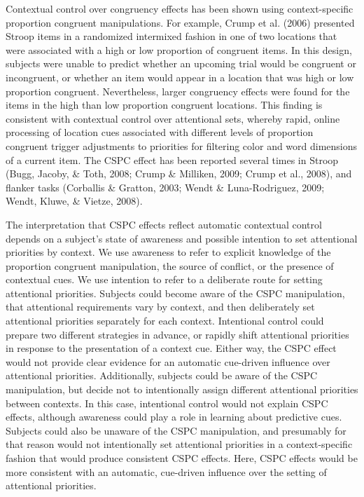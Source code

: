 \documentclass[english,,man,floatsintext]{apa6}
\begin{document}
Contextual control over congruency effects has been shown using
context-specific proportion congruent manipulations. For example, Crump
et al. (2006) presented Stroop items in a randomized intermixed fashion
in one of two locations that were associated with a high or low
proportion of congruent items. In this design, subjects were unable to
predict whether an upcoming trial would be congruent or incongruent, or
whether an item would appear in a location that was high or low
proportion congruent. Nevertheless, larger congruency effects were found
for the items in the high than low proportion congruent locations. This
finding is consistent with contextual control over attentional sets,
whereby rapid, online processing of location cues associated with
different levels of proportion congruent trigger adjustments to
priorities for filtering color and word dimensions of a current item.
The CSPC effect has been reported several times in Stroop (Bugg, Jacoby,
\& Toth, 2008; Crump \& Milliken, 2009; Crump et al., 2008), and flanker
tasks (Corballis \& Gratton, 2003; Wendt \& Luna-Rodriguez, 2009; Wendt,
Kluwe, \& Vietze, 2008).

The interpretation that CSPC effects reflect automatic contextual
control depends on a subject's state of awareness and possible intention
to set attentional priorities by context. We use awareness to refer to
explicit knowledge of the proportion congruent manipulation, the source
of conflict, or the presence of contextual cues. We use intention to
refer to a deliberate route for setting attentional priorities. Subjects
could become aware of the CSPC manipulation, that attentional
requirements vary by context, and then deliberately set attentional
priorities separately for each context. Intentional control could
prepare two different strategies in advance, or rapidly shift
attentional priorities in response to the presentation of a context cue.
Either way, the CSPC effect would not provide clear evidence for an
automatic cue-driven influence over attentional priorities.
Additionally, subjects could be aware of the CSPC manipulation, but
decide not to intentionally assign different attentional priorities
between contexts. In this case, intentional control would not explain
CSPC effects, although awareness could play a role in learning about
predictive cues. Subjects could also be unaware of the CSPC
manipulation, and presumably for that reason would not intentionally set
attentional priorities in a context-specific fashion that would produce
consistent CSPC effects. Here, CSPC effects would be more consistent
with an automatic, cue-driven influence over the setting of attentional
priorities.
\end{document}
